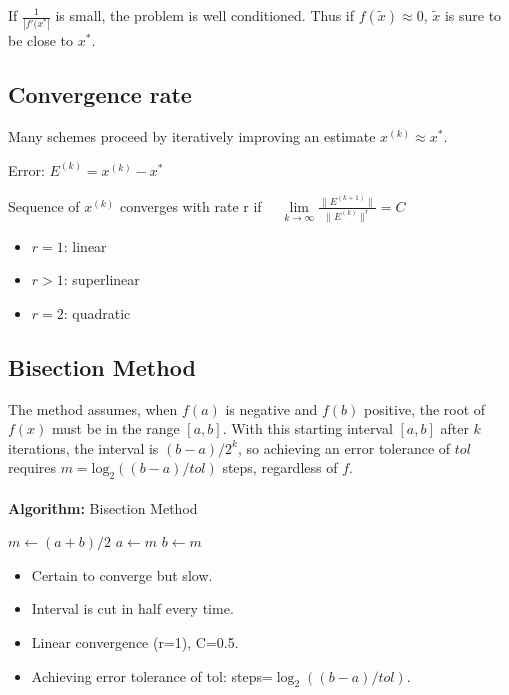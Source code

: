 \documentclass[8pt,a4paper]{scrartcl}
\renewcommand{\compaq}{\setlength{\itemsep}{0mm}\setlength{\parskip}{0cm}}
\begin{document}
\begin{multicols*}{3}
If $\frac{1}{|f'(x^\ast|}$ is small, the problem is well conditioned. Thus if $f(\tilde{x})\approx0$, $\tilde{x}$ is sure to be close to $x^\ast$.


\subsection{Convergence rate}

Many schemes proceed by iteratively improving an estimate $x^{(k)}\approx x^\ast$.

Error: $E^{(k)}=x^{(k)}-x^\ast$

Sequence of $x^{(k)}$ converges with rate r if $\quad\lim\limits_{k\rightarrow\infty}\frac{\|E^{(k+1)}\|}{\|E^{(k)}\|^r}=C$

\begin{itemize}\compaq
\item $r=1$: linear
\item $r>1$: superlinear
\item $r=2$: quadratic
\end{itemize}

\subsection{Bisection Method}

The method assumes, when $f(a)$ is negative and $f(b)$ positive, the root of $f(x)$ must be in the range $[a,b]$. With this starting interval $[a,b]$ after $k$ iterations, the interval is $(b-a)/2^k$, so achieving an error tolerance of $tol$ requires $m = \text{log}_2 ((b-a)/tol)$ steps, regardless of $f$.\\ \\
\noindent
\textbf{Algorithm:} Bisection Method
\begin{algorithmic}
\State $m \leftarrow (a+b)/2$
\State $a \leftarrow m$
\Else 
\State $b \leftarrow m$
\EndIf
\EndWhile
\end{algorithmic}

\begin{itemize}\compaq
\item Certain to converge but slow.
\item Interval is cut in half every time.
\item Linear convergence (r=1), C=0.5.
\item Achieving error tolerance of tol: steps=$\log_2((b-a)/tol)$.
\end{itemize}


\end{multicols*}
\end{document}
